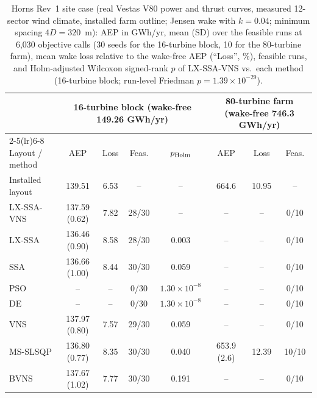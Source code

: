 \begin{table}[!t]
\centering
\caption{Horns Rev~1 site case (real Vestas V80 power and thrust curves, measured 12-sector wind climate, installed farm outline; Jensen wake with $k=0.04$; minimum spacing $4D=320$~m): AEP in GWh/yr, mean (SD) over the feasible runs at 6,030 objective calls (30 seeds for the 16-turbine block, 10 for the 80-turbine farm), mean wake loss relative to the wake-free AEP (``Loss'', \%), feasible runs, and Holm-adjusted Wilcoxon signed-rank $p$ of LX-SSA-VNS vs.\ each method (16-turbine block; run-level Friedman $p=1.39\times10^{-29}$).}
\label{tab:hr-site}
\footnotesize\setlength{\tabcolsep}{4pt}
\begin{tabular}{lccccccc}
\toprule
& \multicolumn{4}{c}{16-turbine block (wake-free 149.26 GWh/yr)} & \multicolumn{3}{c}{80-turbine farm (wake-free 746.3 GWh/yr)} \\
\cmidrule(lr){2-5}\cmidrule(lr){6-8}
Layout / method & AEP & Loss & Feas. & $p_{\rm Holm}$ & AEP & Loss & Feas. \\
\midrule
Installed layout & 139.51 & 6.53 & -- & -- & 664.6 & 10.95 & -- \\
\midrule
LX-SSA-VNS & 137.59 (0.62) & 7.82 & 28/30 & -- & -- & -- & 0/10 \\
LX-SSA & 136.46 (0.90) & 8.58 & 28/30 & 0.003 & -- & -- & 0/10 \\
SSA & 136.66 (1.00) & 8.44 & 30/30 & 0.059 & -- & -- & 0/10 \\
PSO & -- & -- & 0/30 & $1.30\times10^{-8}$ & -- & -- & 0/10 \\
DE & -- & -- & 0/30 & $1.30\times10^{-8}$ & -- & -- & 0/10 \\
VNS & 137.97 (0.80) & 7.57 & 29/30 & 0.059 & -- & -- & 0/10 \\
MS-SLSQP & 136.80 (0.77) & 8.35 & 30/30 & 0.040 & 653.9 (2.6) & 12.39 & 10/10 \\
BVNS & 137.67 (1.02) & 7.77 & 30/30 & 0.191 & -- & -- & 0/10 \\
\bottomrule
\end{tabular}
\end{table}

